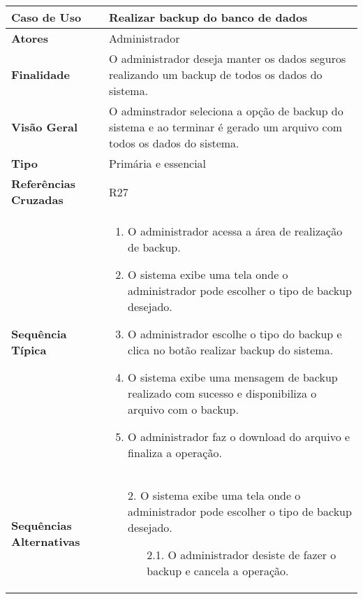 \documentclass[a4paper,11pt]{article}
\begin{document}
\begin{table}[H]
		\begin{tabularx}{\textwidth}{|l|X|}
		\hline
			\textbf{Caso de Uso} &  Realizar backup do banco de dados \\ \hline
			\textbf{Atores} &  Administrador  \\ \hline
			\textbf{Finalidade} &  O administrador deseja manter os dados seguros realizando um backup de todos os dados do sistema. \\ \hline
			\textbf{Visão Geral} & O adminstrador seleciona a opção de backup do sistema e ao terminar é gerado um arquivo com todos os dados do sistema. \\ \hline
			\textbf{Tipo} & Primária e essencial \\ \hline
			\textbf{Referências Cruzadas} &  R27 \\ \hline
			\textbf{Sequência Típica} & 
			\begin{enumerate}
			\item O administrador acessa a área de realização de backup.
			\item O sistema exibe uma tela onde o administrador pode escolher o tipo de backup desejado.	
			\item O administrador escolhe o tipo do backup e clica no botão realizar backup do sistema.
			\item O sistema exibe uma mensagem de backup realizado com sucesso e disponibiliza o arquivo com o backup.
			\item O administrador faz o download do arquivo e finaliza a operação.
			\end{enumerate} \\ \hline
			
			\textbf{Sequências Alternativas} & 
			\begin{itemize}
				\item[2.] O sistema exibe uma tela onde o administrador pode escolher o tipo de backup desejado.
				\begin{itemize}
					\item[2.1.] O administrador desiste de fazer o backup e cancela a operação.
				\end{itemize}
			\end{itemize} \\ \hline
		\end{tabularx}
\end{table}
\end{document}
